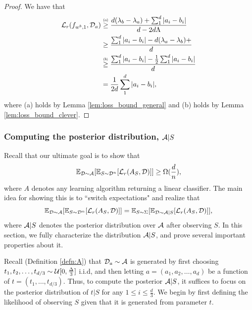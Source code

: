 \begin{proof}
We have that
\begin{equation*}
\begin{split}
\mathcal L_r(f_{w^b, 1}, {\mathcal D}_a) &\stackrel{\scriptscriptstyle(\mkern-1.5mua\mkern-1.5mu)}{\geq} \frac{d(\lambda_b - \lambda_a) + \sum_1^d|a_i - b_i|}{d - 2d\Lambda} \\
&\geq \frac{\sum_1^d|a_i - b_i| - d(\lambda_a - \lambda_b) + }{d} \\
&\stackrel{\scriptscriptstyle(\mkern-1.5mub\mkern-1.5mu)}{\geq} \frac{\sum_1^d|a_i - b_i| - \frac{1}{2}\sum_1^d |a_i - b_i|}{d} \\
&= \frac{1}{2d}\sum_1^d |a_i - b_i|,
\end{split}
\end{equation*}
where (a) holds by Lemma \ref{lem:loss_bound_general} and (b) holds by Lemma \ref{lem:loss_bound_clever}. 
\end{proof}

\subsubsection{Computing the posterior distribution, $\mathcal{A}|S$}\label{subsubsec:posterior}

Recall that our ultimate goal is to show that $$\mathbb{E}_{{\mathcal D} \sim \mathcal{A}}[\mathbb{E}_{S \sim {\mathcal D}^n}[ \mathcal L_r(A_S, {\mathcal D})]] \geq \Omega(\frac{d}{n}),$$ where $A$ denotes any learning algorithm returning a linear classifier.  The main idea for showing this is to ``switch expectations" and realize that $$\mathbb{E}_{{\mathcal D} \sim \mathcal{A}}[\mathbb{E}_{S \sim {\mathcal D}^n} [\mathcal L_r(A_S, {\mathcal D})]] = \mathbb{E}_{S \sim \Sigma}[\mathbb{E}_{{\mathcal D} \sim \mathcal{A}|S}[\mathcal L_r(A_S, {\mathcal D})]],$$ where $\mathcal{A}|S$ denotes the posterior distribution over $\mathcal{A}$ after observing $S$. In this section, we fully characterize the distribution $\mathcal{A}|S$, and prove several important properties about it.

Recall (Definition \ref{defn:A}) that ${\mathcal D}_a \sim \mathcal{A}$ is generated by first choosing $t_1, t_2, \dots, t_{d/3} \sim {\mathcal U}[0, \frac{\Delta}{3}]$ i.i.d, and then letting $a = (a_1, a_2, \dots, a_d)$ be a function of $t = (t_1, \dots, t_{d/3})$. Thus, to compute the posterior $\mathcal{A}|S$, it suffices to focus on the posterior distribution of $t|S$ for any $1 \leq i \leq \frac{d}{3}$. We begin by first defining the likelihood of observing $S$ given that it is generated from parameter $t$.

